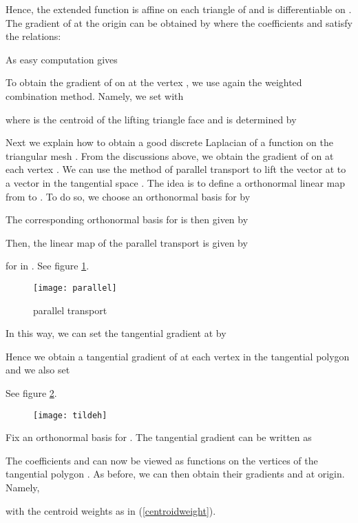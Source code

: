 \documentclass{elsart}
\begin{document}
Hence, the extended function  is affine on each
triangle  of  and is differentiable on .
The gradient  of  at
the origin  can be obtained by  where the coefficients  and
 satisfy the relations:


As easy computation gives


To obtain the gradient  of  on  at the vertex
, we use again the weighted combination method. Namely, we set
 with

 where  is the centroid of the lifting triangle face
 and is determined by


Next we explain how to obtain a good discrete Laplacian  of a function  on the triangular mesh . From the
discussions above, we obtain the gradient  of  on
 at each vertex . We can use the method of parallel transport
to lift the vector  at  to a vector  in the tangential space . The idea
is to define a orthonormal linear map from  to . To
do so, we choose an orthonormal basis for  by

The corresponding orthonormal basis for  is then given by

Then, the linear map  of the parallel transport is given by

for  in . See figure
\ref{parallel}.


\begin{figure}
{\center
\texttt{[image: parallel]}
\caption{parallel transport}\label{parallel}
 }
\end{figure}



In this way, we can set the tangential gradient 
at  by

 Hence we obtain a tangential
gradient  of  at each vertex  in
the tangential polygon  and we also set

 See figure \ref{tildeh}.



\begin{figure}
{\center
\texttt{[image: tildeh]}
\caption{ }\label{tildeh}
 }
\end{figure}



Fix an orthonormal basis  for . The
tangential gradient  can be written as

 The coefficients 
and  can now be viewed as functions on the vertices
 of the tangential polygon . As before, we can
then obtain their gradients  and  at origin. Namely,


with the centroid weights  as in
(\ref{centroidweight}).
\end{document}
